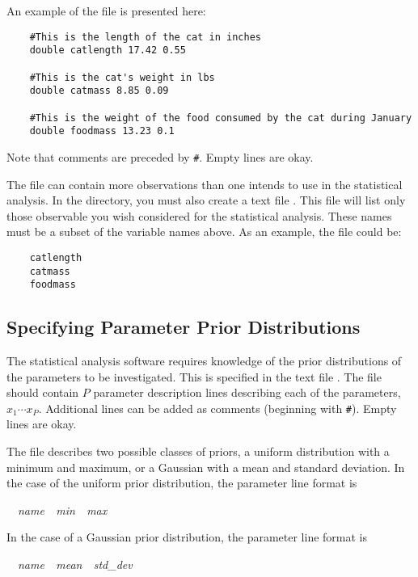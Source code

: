 An example of the  file is presented here:

\begin{verbatim}
    #This is the length of the cat in inches
    double catlength 17.42 0.55

    #This is the cat's weight in lbs
    double catmass 8.85 0.09

    #This is the weight of the food consumed by the cat during January
    double foodmass 13.23 0.1
\end{verbatim}

Note that comments are preceded by \verb+#+. Empty lines are okay.

The  file can contain more observations than one intends to use in the statistical analysis. In the  directory, you must also create a text file . This file will list only those observable you wish considered for the statistical analysis. These names must be a subset of the variable names above. As an example, the file could be:

\begin{verbatim}
    catlength
    catmass
    foodmass
\end{verbatim}

\subsection{Specifying Parameter Prior Distributions}

The statistical analysis software requires knowledge of the prior distributions of the parameters to be investigated. This is specified in the text file . The file should contain $P$ parameter description lines describing each of the parameters, $x_1\cdots x_P$. Additional lines can be added as comments (beginning with \verb+#+). Empty lines are okay.

The  file describes two possible classes of priors, a uniform distribution with a minimum and maximum, or a Gaussian with a mean and standard deviation. In the case of the uniform prior distribution, the parameter line format is

\hspace*{20pt}{\tt uniform}~~{\it name~~min~~max}

In the case of a Gaussian prior distribution, the parameter line format is

\hspace*{20pt}{\tt gaussian}~~{\it name~~mean~~std\_dev}

